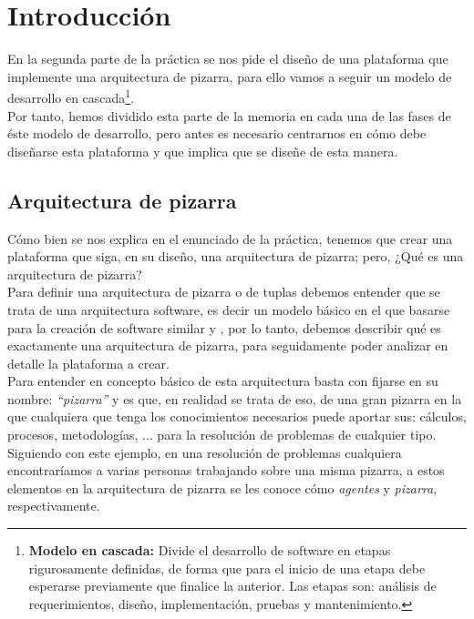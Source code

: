 \chapter{Introducción}
\lettrine[lines=1,slope=4pt,findent=0pt]{E}{}n la segunda parte de la práctica se nos pide el diseño de una plataforma que implemente una arquitectura de pizarra, para ello vamos a seguir un modelo de desarrollo en cascada\footnote{\textbf{Modelo en cascada:} Divide el desarrollo de software en etapas rigurosamente definidas, de forma que para el inicio de una etapa debe esperarse previamente que finalice la anterior. Las etapas son: análisis de requerimientos, diseño, implementación, pruebas y mantenimiento.}.\\

Por tanto, hemos dividido esta parte de la memoria en cada una de las fases de éste modelo de desarrollo, pero antes es necesario centrarnos en cómo debe diseñarse esta plataforma y que implica que se diseñe de esta manera.

\section{Arquitectura de pizarra}
Cómo bien se nos explica en el enunciado de la práctica, tenemos que crear una plataforma que siga, en su diseño, una arquitectura de pizarra; pero, ¿Qué es una arquitectura de pizarra?\\

Para definir una arquitectura de pizarra o de tuplas debemos entender que se trata de una arquitectura software, es decir un modelo básico en el que basarse para la creación de software similar y , por lo tanto, debemos describir qué es exactamente una arquitectura de pizarra, para seguidamente poder analizar en detalle la plataforma a crear.\\

Para entender en concepto básico de esta arquitectura basta con fijarse en su nombre: \emph{\textquotedblleft pizarra\textquotedblright} y es que, en realidad se trata de eso, de una gran pizarra en la que cualquiera que tenga los conocimientos necesarios puede aportar sus: cálculos, procesos, metodologías, ... para la resolución de problemas de cualquier tipo.\\

Siguiendo con este ejemplo, en una resolución de problemas cualquiera encontraríamos a varias personas trabajando sobre una misma pizarra, a estos elementos en la arquitectura de pizarra se les conoce cómo \emph{agentes} y \emph{pizarra}, respectivamente.\\

